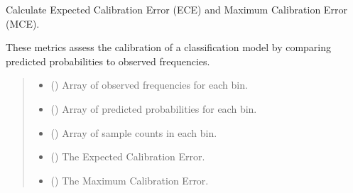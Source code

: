 \documentclass[letterpaper,10pt,english]{sphinxmanual}
\begin{document}

\begin{fulllineitems}
\label{\detokenize{calzone:calzone.metrics.calculate_ece_mce}}
\pysigstartsignatures
{}
\pysigstopsignatures
\sphinxAtStartPar
Calculate Expected Calibration Error (ECE) and Maximum Calibration Error (MCE).

\sphinxAtStartPar
These metrics assess the calibration of a classification model by comparing
predicted probabilities to observed frequencies.
\begin{quote}\begin{description}
\begin{itemize}
\item {} 
\sphinxAtStartPar
{} () \textendash{} Array of observed frequencies for each bin.

\item {} 
\sphinxAtStartPar
{} () \textendash{} Array of predicted probabilities for each bin.

\item {} 
\sphinxAtStartPar
{} () \textendash{} Array of sample counts in each bin.

\end{itemize}

\begin{itemize}
\item {} 
\sphinxAtStartPar
{} () \textendash{} The Expected Calibration Error.

\item {} 
\sphinxAtStartPar
{} () \textendash{} The Maximum Calibration Error.

\end{itemize}


\end{description}
\end{quote}
\end{fulllineitems}
\end{document}
